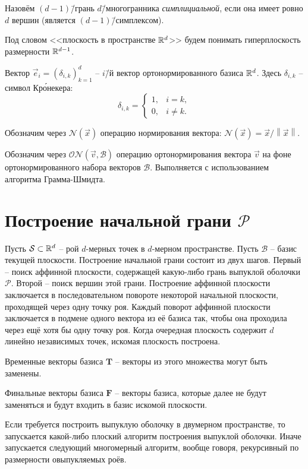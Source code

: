 \documentclass[a4paper,12pt]{article}
\newcommand{\R}[1][]{%
  \ifthenelse{\equal{#1}{}}%
  {\mathbb{R}}%
  {\mathbb{R}^{#1}}}
\newcommand{\Swarm}{\mathcal{S}}              %
\newcommand{\Polyhedron}{\mathcal{P}}         %
\newcommand{\Basis}{\mathcal{B}}              %
\newcommand{\norm}[1]{\left\lVert#1\right\rVert}             %
\newcommand{\Norm}[2][]{\mathcal{N}#1( #2 #1)} %
\newcommand{\ONorm}[3][]{\mathcal{ON}#1( #2, #3 #1)} %
\newcommand{\TempVec}{\mathbf{T}}  %
\newcommand{\FinalVec}{\mathbf{F}} %
\renewcommand{\.}{\hspace{0.2ex}}
\begin{document}
  Назовём $(d-1)$\=/грань $d$\=/многогранника \textit{симплициальной}, если она имеет ровно $d$ вершин (является $(d-1)$\=/симплексом).



  Под словом <<плоскость в пространстве $\R[d]$>> будем понимать гиперплоскость размерности $\R[d-1]$.

  Вектор $\vec e_i = (\delta_{i,k})_{k=1}^d$ -- $i$\=/й вектор ортонормированного базиса $\R[d]$.
  Здесь $\delta_{i,k}$ -- символ Кр\'{о}некера:
  $$
  \delta_{i,k} =
  \begin{cases}
    1, & i=k, \\
    0, & i\neq k.
  \end{cases}
  $$

  Обозначим через $\Norm{\vec x}$ операцию нормирования вектора: $\Norm{\vec x} = \vec x \big / \norm{\vec x}$.

  Обозначим через $\ONorm{\vec v}{\Basis}$ операцию ортонормирования вектора $\vec v$ на фоне ортонормированного набора векторов $\Basis$. Выполняется с использованием алгоритма Грамма-Шмидта.


\section{Построение начальной грани $\Polyhedron$}
  Пусть $\Swarm \subset \R[d]$ -- рой $d$-мерных точек в $d$-мерном пространстве.
  Пусть $\Basis$ -- базис текущей плоскости. Построение начальной грани состоит из двух шагов. Первый -- поиск аффинной плоскости, содержащей какую-либо грань выпуклой оболочки $\Polyhedron$. Второй -- поиск вершин этой грани. Построение аффинной плоскости заключается в последовательном повороте некоторой начальной плоскости, проходящей через одну точку роя. Каждый поворот аффинной плоскости заключается в подмене одного вектора из её базиса так, чтобы она проходила через ещё хотя бы одну точку роя. Когда очередная плоскость содержит $d$ линейно независимых точек, искомая плоскость построена.

  Временные векторы базиса $\TempVec$ -- векторы из этого множества могут быть заменены.

  Финальные векторы базиса $\FinalVec$ -- векторы базиса, которые далее не будут заменяться и будут входить в базис искомой плоскости.

  Если требуется построить выпуклую оболочку в двумерном пространстве, то запускается какой-либо плоский алгоритм построения выпуклой оболочки. Иначе запускается следующий многомерный алгоритм, вообще говоря, рекурсивный по размерности овыпукляемых роёв.
\end{document}
